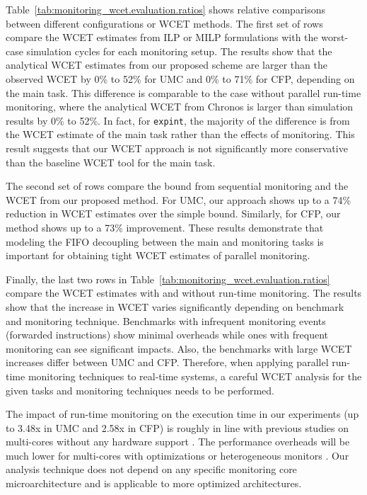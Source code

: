 Table~\ref{tab:monitoring_wcet.evaluation.ratios} shows relative comparisons
between different configurations or WCET methods.  The first set of rows
compare the WCET estimates from ILP or MILP formulations with the worst-case
simulation cycles for each monitoring setup.  The results show that the
analytical WCET estimates from our proposed scheme are larger than the observed
WCET by 0\% to 52\% for UMC and 0\% to 71\% for CFP, depending on the main
task. This difference is comparable to the case without parallel run-time
monitoring, where the analytical WCET from Chronos is larger than simulation
results by 0\% to 52\%.  In fact, for {\tt expint}, the majority of the
difference is from the WCET estimate of the main task rather than the effects
of monitoring.  This result suggests that our WCET approach is not
significantly more conservative than the baseline WCET tool for the main task.

The second set of rows compare the bound from sequential monitoring and the
WCET from our proposed method. For UMC, our approach shows up to a 74\%
reduction in WCET estimates over the simple bound. Similarly, for CFP, our
method shows up to a 73\% improvement.  These results demonstrate that modeling
the FIFO decoupling between the main and monitoring tasks is important for
obtaining tight WCET estimates of parallel monitoring. 

Finally, the last two rows in Table~\ref{tab:monitoring_wcet.evaluation.ratios}
compare the WCET estimates with and without run-time monitoring.  The results
show that the increase in WCET varies significantly depending on benchmark and
monitoring technique. Benchmarks with infrequent monitoring events (forwarded
instructions) show minimal overheads while ones with frequent monitoring can
see significant impacts.  Also, the benchmarks with large WCET increases differ
between UMC and CFP.  Therefore, when applying parallel run-time monitoring
techniques to real-time systems, a careful WCET analysis for the given tasks
and monitoring techniques needs to be performed. 

The impact of run-time monitoring on the execution time in our experiments (up
to 3.48x in UMC and 2.58x in CFP) is roughly in line with previous studies on
multi-cores without any hardware support \cite{chen08-lba, nagarajan08-dift}.
The performance overheads will be much lower for multi-cores with optimizations
\cite{chen08-lba} or heterogeneous monitors \cite{flexcore-micro10}.  Our
analysis technique does not depend on any specific monitoring core
microarchitecture and is applicable to more optimized architectures.

